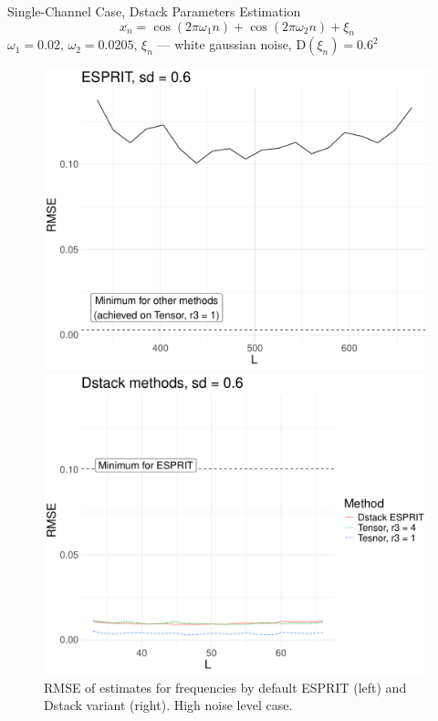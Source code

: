 \documentclass[pdf, unicode, ucs, notheorems]{beamer}
\theoremstyle{definition}
\begin{document}
\begin{frame}{Single-Channel Case, Dstack Parameters Estimation}
  \vspace*{-0.3cm}
  \[
    x_{n} = \cos(2 \pi \omega_1 n) +
    \cos(2 \pi \omega_2 n) + \xi_n
  \]
  $\omega_1 = 0.02,\, \omega_2 = 0.0205$, $\xi_n$ --- white gaussian
  noise, $\mathrm{D}(\xi_n) = 0.6^2$
  \begin{figure}
    \begin{minipage}{0.48\textwidth}
      \centering
      \includegraphics[width=\textwidth]{img/htlsd_byL_real_param_rmse_esprit_3.pdf}
    \end{minipage}
    \begin{minipage}{0.48\textwidth}
      \centering
      \includegraphics[width=\textwidth]{img/htlsd_byL_real_param_rmse_dstack_3.pdf}
    \end{minipage}
    \caption{RMSE of estimates for frequencies by default ESPRIT
    (left) and Dstack variant (right). High noise level case.}
  \end{figure}
\end{frame}
\end{document}
